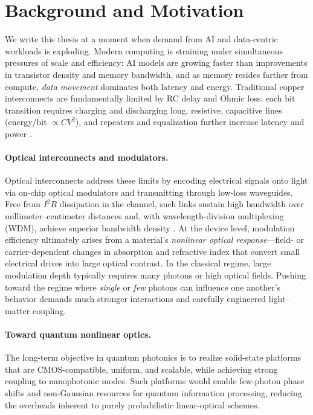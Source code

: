 \section{Background and Motivation}
\label{sec:bg_motivation}

We write this thesis at a moment when demand from AI and data-centric workloads is exploding. Modern computing is straining under simultaneous pressures of scale and efficiency: AI models are growing faster than improvements in transistor density and memory bandwidth, and as memory resides farther from compute, \emph{data movement} dominates both latency and energy. Traditional copper interconnects are fundamentally limited by RC delay and Ohmic loss: each bit transition requires charging and discharging long, resistive, capacitive lines (energy/bit $\propto CV^2$), and repeaters and equalization further increase latency and power \cite{Miller_InterconnectsReview,SunSiliconPhotonics}.

\paragraph{Optical interconnects and modulators.}
Optical interconnects address these limits by encoding electrical signals onto light via on-chip optical modulators and transmitting through low-loss waveguides. Free from $I^2R$ dissipation in the channel, such links sustain high bandwidth over millimeter–centimeter distances and, with wavelength-division multiplexing (WDM), achieve superior bandwidth density \cite{Miller_InterconnectsReview,SunSiliconPhotonics}. At the device level, modulation efficiency ultimately arises from a material’s \emph{nonlinear optical response}—field- or carrier-dependent changes in absorption and refractive index that convert small electrical drives into large optical contrast. 
In the classical regime, large modulation depth typically requires many photons or high optical fields. 
Pushing toward the regime where \emph{single} or \emph{few} photons can influence one another’s behavior demands much stronger interactions and carefully engineered light–matter coupling.

\paragraph{Toward quantum nonlinear optics.}
The long-term objective in quantum photonics is to realize solid-state platforms that are CMOS-compatible, uniform, and scalable, while achieving strong coupling to nanophotonic modes. Such platforms would enable few-photon phase shifts and non-Gaussian resources for quantum information processing, reducing the overheads inherent to purely probabilistic linear-optical schemes.

